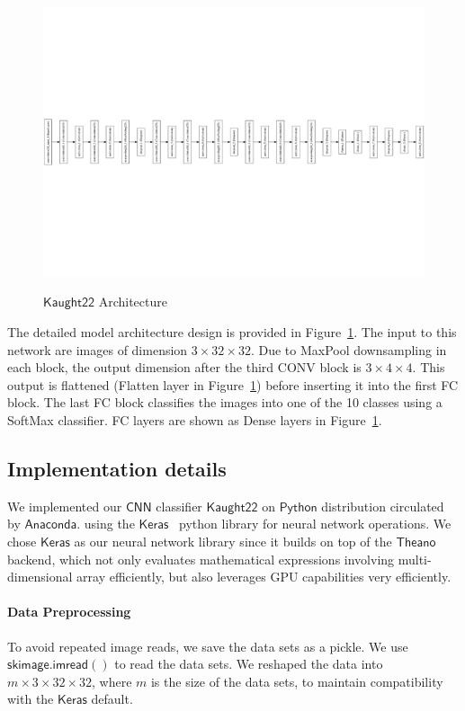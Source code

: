 \documentclass[]{article}
\newcommand*{\CNN}{\ensuremath{\mathsf{CNN}}}
\newcommand*{\K}{\ensuremath{\mathsf{Kaught22}}}
\newcommand*{\keras}{\ensuremath{\mathsf{Keras}}}
\newcommand*{\Theano}{\ensuremath{\mathsf{Theano}}}
\begin{document}
\begin{figure}[t]
\centering
\includegraphics[width=\textwidth, trim={0, 8cm, 0, 8cm}]{model1.pdf}
\label{Fig:Model}
\caption{$\K$ Architecture}
\end{figure}
The detailed model architecture design is provided in Figure~\ref{Fig:Model}. The input to this network are images of dimension $3\times 32\times 32$. Due to MaxPool downsampling in each block, the output dimension after the third CONV block is $3 \times 4 \times 4$. This output is flattened (Flatten layer in Figure~\ref{Fig:Model}) before inserting it into the first FC block. The last FC block classifies the images into one of the 10 classes using a SoftMax classifier.  FC layers are shown as Dense layers in Figure~\ref{Fig:Model}. 




\subsection{Implementation details}
\label{Sec:Implementation}
We implemented our $\CNN$ classifier $\K$ on $\mathsf{Python}$ distribution circulated by $\mathsf{Anaconda}$. using the $\keras$~\cite{chollet2015keras} python library for neural network operations. We chose $\keras$  as our neural network library since it  builds on top of the $\Theano$~\cite{bergstra+al:2010-scipy, Bastien-Theano-2012} backend, which not only evaluates mathematical expressions involving multi-dimensional array efficiently,  but also leverages GPU capabilities very efficiently. 

\paragraph{Data Preprocessing}
To avoid repeated image reads, we save the data sets as a pickle.
We use $\mathsf{skimage.imread()}$ to read the data sets. We reshaped the data into $m\times 3\times 32 \times 32$, where $m$ is the size of the data sets, to maintain compatibility with the $\keras$ default.
\end{document}

